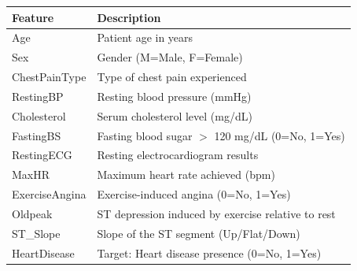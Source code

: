 \documentclass[11pt]{article}
\begin{document}
{\def\LTcaptype{none} %
\begin{longtable}[]{@{}p{3cm}p{10cm}@{}}
	\toprule\noalign{}
	\textbf{Feature} & \textbf{Description} \\
	\midrule\noalign{}
	\endhead
	\bottomrule\noalign{}
	\endlastfoot
	Age & Patient age in years \\
	Sex & Gender (M=Male, F=Female) \\
	ChestPainType & Type of chest pain experienced \\
	RestingBP & Resting blood pressure (mmHg) \\
	Cholesterol & Serum cholesterol level (mg/dL) \\
	FastingBS & Fasting blood sugar $>$ 120 mg/dL (0=No, 1=Yes) \\
	RestingECG & Resting electrocardiogram results \\
	MaxHR & Maximum heart rate achieved (bpm) \\
	ExerciseAngina & Exercise-induced angina (0=No, 1=Yes) \\
	Oldpeak & ST depression induced by exercise relative to rest \\
	ST\_Slope & Slope of the ST segment (Up/Flat/Down) \\
	HeartDisease & Target: Heart disease presence (0=No, 1=Yes) \\
\end{longtable}
}
\end{document}
